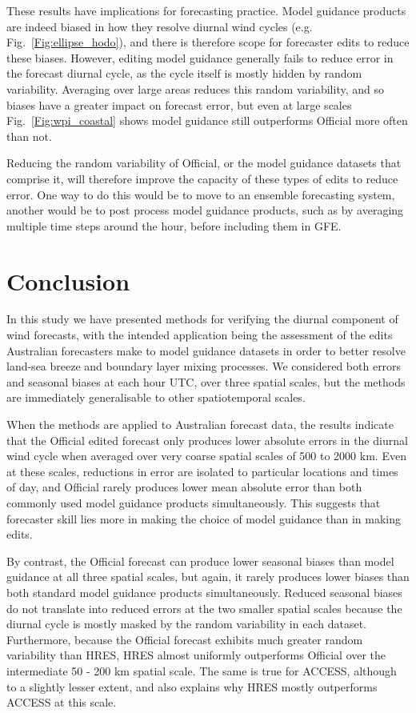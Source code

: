 \documentclass[twocol]{ametsoc}
\begin{document}
These results have implications for forecasting practice. Model guidance products are indeed biased in how they resolve diurnal wind cycles (e.g. Fig.~\ref{Fig:ellipse_hodo}), and there is therefore scope for forecaster edits to reduce these biases. However, editing model guidance generally fails to reduce error in the forecast diurnal cycle, as the cycle itself is mostly hidden by random variability. Averaging over large areas reduces this random variability, and so biases have a greater impact on forecast error, but even at large scales Fig.~\ref{Fig:wpi_coastal} shows model guidance still outperforms Official more often than not. 

Reducing the random variability of Official, or the model guidance datasets that comprise it, will therefore improve the capacity of these types of edits to reduce error. One way to do this would be to move to an ensemble forecasting system, another would be to post process model guidance products, such as by averaging multiple time steps around the hour, before including them in GFE. 

\section{Conclusion}
\label{Sec:Conclusion}
In this study we have presented methods for verifying the diurnal component of wind forecasts, with the intended application being the assessment of the edits Australian forecasters make to model guidance datasets in order to better resolve land-sea breeze and boundary layer mixing processes. We considered both errors and seasonal biases at each hour UTC, over three spatial scales, but the methods are immediately generalisable to other spatiotemporal scales. 

When the methods are applied to Australian forecast data, the results indicate that the Official edited forecast only produces lower absolute errors in the diurnal wind cycle when averaged over very coarse spatial scales of 500 to 2000 km. Even at these scales, reductions in error are isolated to particular locations and times of day, and Official rarely produces lower mean absolute error than both commonly used model guidance products simultaneously. This suggests that forecaster skill lies more in making the choice of model guidance than in making edits.

By contrast, the Official forecast can produce lower seasonal biases than model guidance at all three spatial scales, but again, it rarely produces lower biases than both standard model guidance products simultaneously. Reduced seasonal biases do not translate into reduced errors at the two smaller spatial scales because the diurnal cycle is mostly masked by the random variability in each dataset. Furthermore, because the Official forecast exhibits much greater random variability than HRES, HRES almost uniformly outperforms Official over the intermediate 50 - 200 km spatial scale. The same is true for ACCESS, although to a slightly lesser extent, and also explains why HRES mostly outperforms ACCESS at this scale. 
\end{document}
